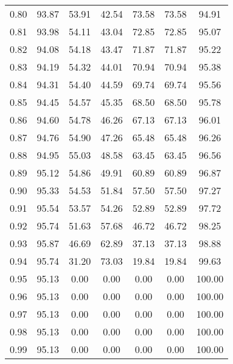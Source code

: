\begin{tabular}{|c|c|c|c|c|c|c|}
      0.80 &     93.87 &     53.91 &      42.54 &   73.58 &      73.58 &         94.91 \\
      0.81 &     93.98 &     54.11 &      43.04 &   72.85 &      72.85 &         95.07 \\
      0.82 &     94.08 &     54.18 &      43.47 &   71.87 &      71.87 &         95.22 \\
      0.83 &     94.19 &     54.32 &      44.01 &   70.94 &      70.94 &         95.38 \\
      0.84 &     94.31 &     54.40 &      44.59 &   69.74 &      69.74 &         95.56 \\
      0.85 &     94.45 &     54.57 &      45.35 &   68.50 &      68.50 &         95.78 \\
      0.86 &     94.60 &     54.78 &      46.26 &   67.13 &      67.13 &         96.01 \\
      0.87 &     94.76 &     54.90 &      47.26 &   65.48 &      65.48 &         96.26 \\
      0.88 &     94.95 &     55.03 &      48.58 &   63.45 &      63.45 &         96.56 \\
      0.89 &     95.12 &     54.86 &      49.91 &   60.89 &      60.89 &         96.87 \\
      0.90 &     95.33 &     54.53 &      51.84 &   57.50 &      57.50 &         97.27 \\
      0.91 &     95.54 &     53.57 &      54.26 &   52.89 &      52.89 &         97.72 \\
      0.92 &     95.74 &     51.63 &      57.68 &   46.72 &      46.72 &         98.25 \\
      0.93 &     95.87 &     46.69 &      62.89 &   37.13 &      37.13 &         98.88 \\
      0.94 &     95.74 &     31.20 &      73.03 &   19.84 &      19.84 &         99.63 \\
      0.95 &     95.13 &      0.00 &       0.00 &    0.00 &       0.00 &        100.00 \\
      0.96 &     95.13 &      0.00 &       0.00 &    0.00 &       0.00 &        100.00 \\
      0.97 &     95.13 &      0.00 &       0.00 &    0.00 &       0.00 &        100.00 \\
      0.98 &     95.13 &      0.00 &       0.00 &    0.00 &       0.00 &        100.00 \\
      0.99 &     95.13 &      0.00 &       0.00 &    0.00 &       0.00 &        100.00 \\
\bottomrule
\end{tabular}
